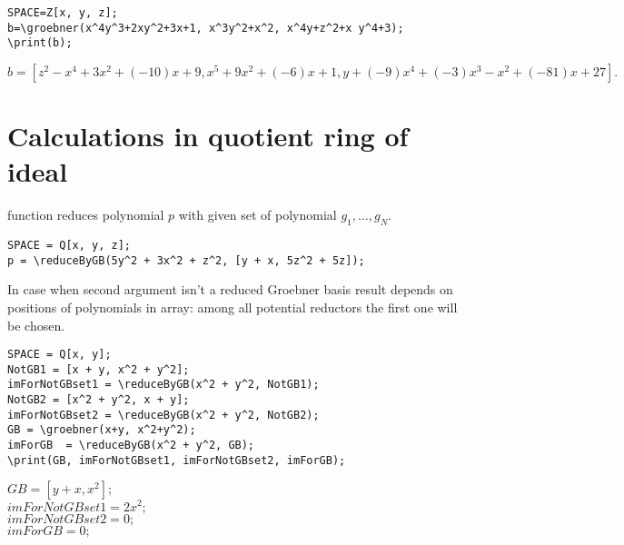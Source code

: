 \begin{verbatim}
SPACE=Z[x, y, z];
b=\groebner(x^4y^3+2xy^2+3x+1, x^3y^2+x^2, x^4y+z^2+x y^4+3);  
\print(b);
\end{verbatim}

{$b = [z^2-x^4+3x^2+(-10)x+9, x^5+9x^2+(-6)x+1, y+(-9)x^4+(-3)x^3-x^2+(-81)x+27]. $}

\section{Calculations in quotient ring of ideal}

 function reduces polynomial $p$ with
given set of polynomial $g_1, \ldots, g_N$.

\begin{verbatim}
SPACE = Q[x, y, z];
p = \reduceByGB(5y^2 + 3x^2 + z^2, [y + x, 5z^2 + 5z]);
\end{verbatim}


In case when second argument isn't a reduced Groebner basis
result depends on positions of polynomials in array:
among all potential reductors the first one will be chosen.

\begin{verbatim}
SPACE = Q[x, y];
NotGB1 = [x + y, x^2 + y^2];
imForNotGBset1 = \reduceByGB(x^2 + y^2, NotGB1);
NotGB2 = [x^2 + y^2, x + y];
imForNotGBset2 = \reduceByGB(x^2 + y^2, NotGB2);
GB = \groebner(x+y, x^2+y^2);  
imForGB  = \reduceByGB(x^2 + y^2, GB);
\print(GB, imForNotGBset1, imForNotGBset2, imForGB);
\end{verbatim}

 {
$GB = [y+x, x^2];$\\
$imForNotGBset1 = 2x^2;$\\
$imForNotGBset2 = 0;$\\
$imForGB = 0;$
}



